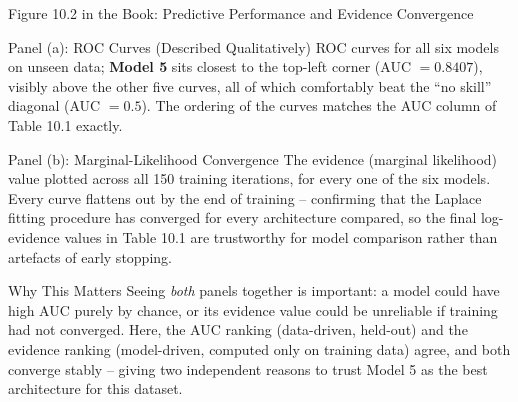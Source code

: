 \documentclass[aspectratio=169,10pt]{beamer}
\begin{document}
\begin{frame}{Figure 10.2 in the Book: Predictive Performance and Evidence Convergence}

  \begin{exampleblock}{Panel (a): ROC Curves (Described Qualitatively)}
    ROC curves for all six models on unseen data; \textbf{Model 5} sits
    closest to the top-left corner (AUC $= 0.8407$), visibly above the other
    five curves, all of which comfortably beat the ``no skill'' diagonal
    (AUC $=0.5$). The ordering of the curves matches the AUC column of
    Table 10.1 exactly.
  \end{exampleblock}

  \begin{exampleblock}{Panel (b): Marginal-Likelihood Convergence}
    The evidence (marginal likelihood) value plotted across all 150 training
    iterations, for every one of the six models. Every curve flattens out by
    the end of training -- confirming that the Laplace fitting procedure has
    converged for every architecture compared, so the final log-evidence
    values in Table 10.1 are trustworthy for model comparison rather than
    artefacts of early stopping.
  \end{exampleblock}

  \begin{block}{Why This Matters}
    Seeing \emph{both} panels together is important: a model could have high
    AUC purely by chance, or its evidence value could be unreliable if
    training had not converged. Here, the AUC ranking (data-driven, held-out)
    and the evidence ranking (model-driven, computed only on training data)
    agree, and both converge stably -- giving two independent reasons to
    trust Model 5 as the best architecture for this dataset.
  \end{block}

\end{frame}
\end{document}
